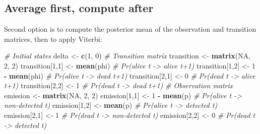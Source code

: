 \documentclass[
  12pt,
]{krantz}
\newenvironment{Shaded}{\begin{snugshade}}{\end{snugshade}}
\newcommand{\CommentTok}[1]{\textcolor[rgb]{0.56,0.35,0.01}{\textit{#1}}}
\newcommand{\ConstantTok}[1]{\textcolor[rgb]{0.56,0.35,0.01}{#1}}
\newcommand{\DecValTok}[1]{\textcolor[rgb]{0.00,0.00,0.81}{#1}}
\newcommand{\FunctionTok}[1]{\textcolor[rgb]{0.13,0.29,0.53}{\textbf{#1}}}
\newcommand{\NormalTok}[1]{#1}
\newcommand{\OtherTok}[1]{\textcolor[rgb]{0.56,0.35,0.01}{#1}}
\newcommand{\SpecialCharTok}[1]{\textcolor[rgb]{0.81,0.36,0.00}{\textbf{#1}}}
\begin{document}
\hypertarget{average-first-compute-after}{%
\subsection{Average first, compute after}\label{average-first-compute-after}}

Second option is to compute the posterior mean of the observation and transition matrices, then to apply Viterbi:

\begin{Shaded}
\begin{Highlighting}[]
\CommentTok{\# Initial states}
\NormalTok{delta }\OtherTok{\textless{}{-}} \FunctionTok{c}\NormalTok{(}\DecValTok{1}\NormalTok{, }\DecValTok{0}\NormalTok{)}
\CommentTok{\# Transition matrix}
\NormalTok{transition }\OtherTok{\textless{}{-}} \FunctionTok{matrix}\NormalTok{(}\ConstantTok{NA}\NormalTok{, }\DecValTok{2}\NormalTok{, }\DecValTok{2}\NormalTok{)}
\NormalTok{transition[}\DecValTok{1}\NormalTok{,}\DecValTok{1}\NormalTok{] }\OtherTok{\textless{}{-}} \FunctionTok{mean}\NormalTok{(phi)      }\CommentTok{\# Pr(alive t {-}\textgreater{} alive t+1)}
\NormalTok{transition[}\DecValTok{1}\NormalTok{,}\DecValTok{2}\NormalTok{] }\OtherTok{\textless{}{-}} \DecValTok{1} \SpecialCharTok{{-}} \FunctionTok{mean}\NormalTok{(phi)  }\CommentTok{\# Pr(alive t {-}\textgreater{} dead t+1)}
\NormalTok{transition[}\DecValTok{2}\NormalTok{,}\DecValTok{1}\NormalTok{] }\OtherTok{\textless{}{-}} \DecValTok{0}              \CommentTok{\# Pr(dead t {-}\textgreater{} alive t+1)}
\NormalTok{transition[}\DecValTok{2}\NormalTok{,}\DecValTok{2}\NormalTok{] }\OtherTok{\textless{}{-}} \DecValTok{1}              \CommentTok{\# Pr(dead t {-}\textgreater{} dead t+1)}
\CommentTok{\# Observation matrix }
\NormalTok{emission }\OtherTok{\textless{}{-}} \FunctionTok{matrix}\NormalTok{(}\ConstantTok{NA}\NormalTok{, }\DecValTok{2}\NormalTok{, }\DecValTok{2}\NormalTok{)}
\NormalTok{emission[}\DecValTok{1}\NormalTok{,}\DecValTok{1}\NormalTok{] }\OtherTok{\textless{}{-}} \DecValTok{1} \SpecialCharTok{{-}} \FunctionTok{mean}\NormalTok{(p)      }\CommentTok{\# Pr(alive t {-}\textgreater{} non{-}detected t)}
\NormalTok{emission[}\DecValTok{1}\NormalTok{,}\DecValTok{2}\NormalTok{] }\OtherTok{\textless{}{-}} \FunctionTok{mean}\NormalTok{(p)          }\CommentTok{\# Pr(alive t {-}\textgreater{} detected t)}
\NormalTok{emission[}\DecValTok{2}\NormalTok{,}\DecValTok{1}\NormalTok{] }\OtherTok{\textless{}{-}} \DecValTok{1}                \CommentTok{\# Pr(dead t {-}\textgreater{} non{-}detected t)}
\NormalTok{emission[}\DecValTok{2}\NormalTok{,}\DecValTok{2}\NormalTok{] }\OtherTok{\textless{}{-}} \DecValTok{0}                \CommentTok{\# Pr(dead t {-}\textgreater{} detected t)}

\end{Highlighting}
\end{Shaded}
\end{document}
